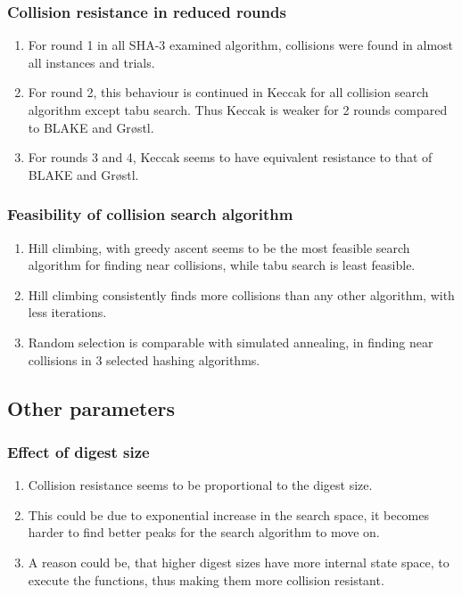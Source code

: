\documentclass{beamer}
\begin{document}
\begin{frame}
\frametitle{Collision resistance in reduced rounds}
\begin{enumerate}
\item For round 1 in all SHA-3 examined algorithm, collisions were found in almost all instances and
trials.
\item For round 2, this behaviour is continued in Keccak for all collision search algorithm except tabu
search. Thus Keccak is weaker for 2 rounds compared to BLAKE and Gr{\o}stl.
\item For rounds 3 and 4, Keccak seems to have equivalent resistance to that of BLAKE and Gr{\o}stl.
\end{enumerate}
\end{frame}

\begin{frame}
\frametitle{Feasibility of collision search algorithm}
\begin{enumerate}
\item Hill climbing, with greedy ascent seems to be the most feasible search algorithm for finding near
collisions, while tabu search is least feasible.
\item Hill climbing consistently finds more collisions than any other algorithm, with less iterations.
\item Random selection is comparable with simulated annealing, in finding near collisions in 3 selected
hashing algorithms.
\end{enumerate}
\end{frame}

\subsection{Other parameters}

\begin{frame}
\frametitle{Effect of digest size}
\begin{enumerate}
\item Collision resistance seems to be proportional to the digest size.
\item This could be due to exponential increase in the search space, it becomes harder to find better peaks
for the search algorithm to move on.
\item A reason could be, that higher digest sizes have more internal state space, to execute the functions,
thus making them more collision resistant.
\end{enumerate}
\end{frame}
\end{document}
